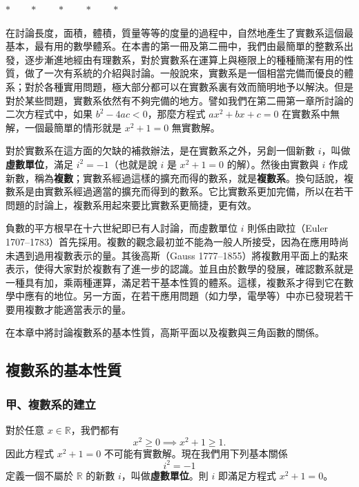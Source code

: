 \begin{center}
$* \qquad * \qquad * \qquad * \qquad *$
\end{center}

在討論長度，面積，體積，質量等等的度量的過程中，自然地產生了實數系這個最基本，最有用的數學體系。在本書的第一冊及第二冊中，我們由最簡單的整數系出發，逐步漸進地經由有理數系，對於實數系在運算上與極限上的種種簡潔有用的性質，做了一次有系統的介紹與討論。一般說來，實數系是一個相當完備而優良的體系；對於各種實用問題，極大部分都可以在實數系裏有效而簡明地予以解決。但是對於某些問題，實數系依然有不夠完備的地方。譬如我們在第二冊第一章所討論的二次方程式中，如果 $b^2-4ac < 0$，那麼方程式 $ax^2+bx+c=0$ 在實數系中無解，一個最簡單的情形就是 $x^2+1=0$ 無實數解。

對於實數系在這方面的欠缺的補救辦法，是在實數系之外，另創一個新數 $i$，叫做\textbf{虛數單位}，滿足 $i^2=-1$（也就是說 $i$ 是 $x^2+1=0$ 的解）。然後由實數與 $i$ 作成新數，稱為\textbf{複數}；實數系經過這樣的擴充而得的數系，就是\textbf{複數系}。換句話說，複數系是由實數系經過適當的擴充而得到的數系。它比實數系更加完備，所以在若干問題的討論上，複數系用起來要比實數系更簡捷，更有效。

負數的平方根早在十六世紀即已有人討論，而虛數單位 $i$ 則係由歐拉（Euler 1707--1783）首先採用。複數的觀念最初並不能為一般人所接受，因為在應用時尚未遇到過用複數表示的量。其後高斯（Gauss 1777--1855）將複數用平面上的點來表示，使得大家對於複數有了進一步的認識。並且由於數學的發展，確認數系就是一種具有加，乘兩種運算，滿足若干基本性質的體系。這樣，複數系才得到它在數學中應有的地位。另一方面，在若干應用問題（如力學，電學等）中亦已發現若干要用複數才能適當表示的量。

在本章中將討論複數系的基本性質，高斯平面以及複數與三角函數的關係。


\subsection{複數系的基本性質}\label{sec:b4s-5-1}

\subsubsection*{甲、複數系的建立}

對於任意 $x \in \mathbb{R}$，我們都有
\[
x^2 \ge 0 \implies x^2+1 \ge 1.
\]
因此方程式 $x^2+1=0$ 不可能有實數解。現在我們用下列基本關係
\[
i^2 = -1
\]
定義一個不屬於 $\mathbb{R}$ 的新數 $i$，叫做\textbf{虛數單位}。則 $i$ 即滿足方程式 $x^2+1=0$。

